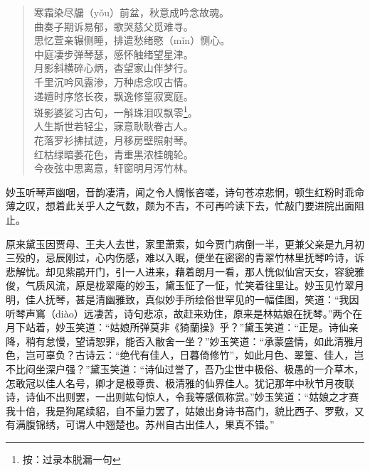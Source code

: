 \documentclass[12pt,oneside]{book}
\newenvironment{shici}{%
\begin{verse}%
\centering\large\hspace{12pt}}%
{\end{verse}}
\begin{document}
\begin{shici}
寒霜染尽牖（yǒu）前盆，秋意成吟念故魂。\\
曲奏子期诉易郁，歌哭慈父觅难寻。\\
思忆萱亲辗侧睡，排遣愁绪愍（mǐn）恻心。\\
中庭凄步弹琴瑟，感怀触绪望星津。\\
月影斜横碎心炳，杳望家山伴梦行。\\
千里沉吟风露渗，万种虑念叹古情。\\
递嬗时序悠长夜，飘逸修篁寂寞庭。\\
斑影婆娑习古句，一斛珠泪叹飘零\footnote{按：过录本脱漏一句}。\\
人生斯世若轻尘，寐意耿耿眷古人。\\
花落罗衫拂拭迹，月移房壁照射琴。\\
红枯绿暗萎花色，青重黑浓桂魄轮。\\
今夜弦中思离意，轩窗明月泻竹林。
\end{shici}


妙玉听琴声幽咽，音韵凄清，闻之令人惆怅咨嗟，诗句苍凉悲惘，顿生红粉时乖命薄之叹，想着此关乎人之气数，颇为不吉，不可再吟读下去，忙敲门要进院出面阻止。

原来黛玉因贾母、王夫人去世，家里萧索，如今贾门病倒一半，更兼父亲是九月初三殁的，忌辰刚过，心内伤感，难以入眠，便坐在密密的青翠竹林里抚琴吟诗，诉悲解忧。却见紫鹃开门，引一人进来，藉着朗月一看，那人恍似仙宫天女，容貌雅俊，气质风流，原是栊翠庵的妙玉，黛玉怔了一怔，忙笑着往里让。妙玉见竹翠月明，佳人抚琴，甚是清幽雅致，真似妙手所绘俗世罕见的一幅佳图，笑道：“我因听琴声窵（diào）远凄苦，诗句悲凉，故赶来劝住，原来是林姑娘在抚琴。”两个在月下站着，妙玉笑道：“姑娘所弹莫非《猗蘭操》乎？”黛玉笑道：“正是。诗仙亲降，稍有怠慢，望请恕罪，能否入敝舍一坐？”妙玉笑道：“承蒙盛情，如此清雅月色，岂可辜负？古诗云：“绝代有佳人，日暮倚修竹”，如此月色、翠篁、佳人，岂不比闷坐深户强？”黛玉笑道：“诗仙过誉了，吾乃尘世中极俗、极愚的一介草木，怎敢冠以佳人名号，卿才是极尊贵、极清雅的仙界佳人。犹记那年中秋节月夜联诗，诗仙不出则罢，一出则竑句惊人，令我等感佩称赏。”妙玉笑道：“姑娘之才赛我十倍，我是狗尾续貂，自不量力罢了，姑娘出身诗书高门，貌比西子、罗敷，又有满腹锦绣，可谓人中翘楚也。苏州自古出佳人，果真不错。”
\end{document}
